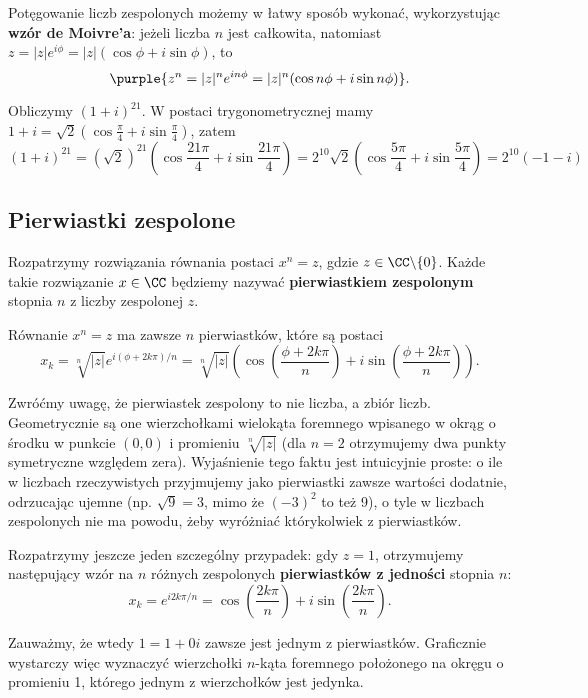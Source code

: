 Potęgowanie liczb zespolonych możemy w łatwy sposób wykonać, wykorzystując \textbf{wzór de Moivre'a}:
jeżeli liczba $n$ jest całkowita, natomiast $z=|z|e^{i\phi}=|z|(\cos\phi + i\sin\phi)$, to
$$
\purple{z^n = |z|^ne^{in\phi} = |z|^n(\cos{n\phi} + i\sin{n\phi})}.
$$

\begin{example}
    Obliczymy $(1+i)^{21}$. W postaci trygonometrycznej mamy $1+i=\sqrt{2}(\cos\frac{\pi}{4}+i\sin\frac{\pi}{4})$, zatem
    $$
    (1+i)^{21} = (\sqrt{2})^{21}\left(\cos\frac{21\pi}{4}+i\sin\frac{21\pi}{4}\right) = 2^{10}\sqrt{2}\left(\cos\frac{5\pi}{4}+i\sin\frac{5\pi}{4}\right) = 2^{10}(-1-i)
    $$
\end{example}

\subsection{Pierwiastki zespolone}

Rozpatrzymy rozwiązania równania postaci $x^n = z$, gdzie $z \in \CC \backslash \{0\}$. Każde takie rozwiązanie $x \in \CC$ będziemy nazywać \textbf{pierwiastkiem zespolonym} stopnia $n$ z liczby zespolonej $z$.

Równanie $x^n = z$ ma zawsze $n$ pierwiastków, które są postaci
$$
x_k = \sqrt[n]{|z|} e^{i(\phi+2k\pi)/n} = \sqrt[n]{|z|}\left(\cos\left(\frac{\phi+2k\pi}{n}\right) + i\sin\left(\frac{\phi+2k\pi}{n}\right)\right).
$$

Zwróćmy uwagę, że pierwiastek zespolony to nie liczba, a zbiór liczb. Geometrycznie są one wierzchołkami wielokąta foremnego wpisanego w okrąg o środku w punkcie $(0, 0)$ i promieniu $\sqrt[n]{|z|}$ (dla $n = 2$ otrzymujemy dwa punkty symetryczne względem zera). Wyjaśnienie tego faktu jest intuicyjnie proste: o ile w liczbach rzeczywistych przyjmujemy jako pierwiastki zawsze wartości dodatnie, odrzucając ujemne (np. $\sqrt{9} = 3$, mimo że $(-3)^2$ to też 9), o tyle w liczbach zespolonych nie ma powodu, żeby wyróżniać którykolwiek z pierwiastków.


Rozpatrzymy jeszcze jeden szczególny przypadek: gdy $z = 1$, otrzymujemy następujący wzór na $n$ różnych zespolonych \textbf{pierwiastków z jedności} stopnia $n$:
$$
x_k = e^{i2k\pi/n} = \cos\left(\frac{2k\pi}{n}\right) + i\sin\left(\frac{2k\pi}{n}\right).
$$

Zauważmy, że wtedy $1 = 1 + 0i$ zawsze jest jednym z pierwiastków. Graficznie wystarczy więc wyznaczyć wierzchołki $n$-kąta foremnego położonego na okręgu o promieniu 1, którego jednym z wierzchołków jest jedynka.


